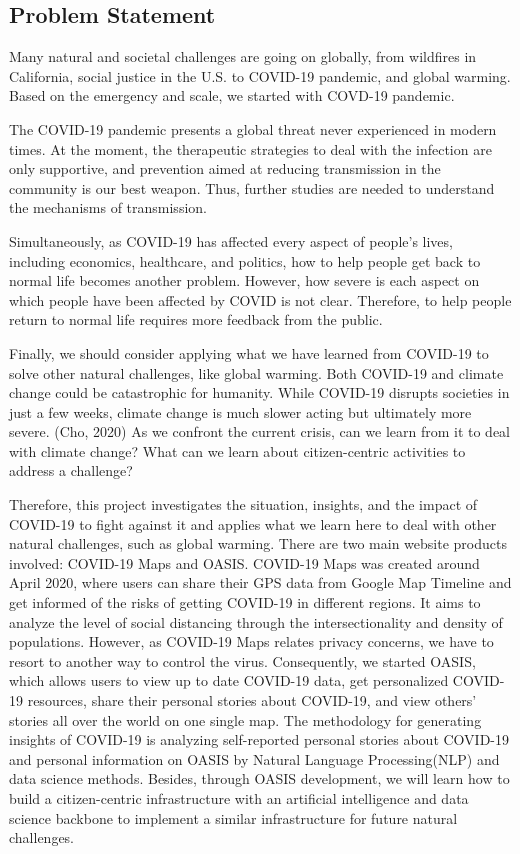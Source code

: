 \documentclass{ucsdreport}
\begin{document}
\subsection{Problem Statement}
Many natural and societal challenges are going on globally, from wildfires in 
California, social justice in the U.S. to COVID-19 pandemic, and global 
warming. Based on the emergency and scale, we started with COVD-19 pandemic. 

The COVID-19 pandemic presents a global threat never experienced in modern 
times. At the moment, the therapeutic strategies to deal with the infection are
only supportive, and prevention aimed at reducing transmission in the community
is our best weapon. Thus, further studies are needed to understand the 
mechanisms of transmission.

Simultaneously, as COVID-19 has affected every aspect of people’s lives, 
including economics, healthcare, and politics, how to help people get back to 
normal life becomes another problem. However, how severe is each aspect on 
which people have been affected by COVID is not clear. Therefore, to help 
people return to normal life requires more feedback from the public. 

Finally, we should consider applying what we have learned from COVID-19 to 
solve other natural challenges, like global warming. Both COVID-19 and climate 
change could be catastrophic for humanity. While COVID-19 disrupts societies in
just a few weeks, climate change is much slower acting but ultimately more 
severe. (Cho, 2020) As we confront the current crisis, 
can we learn from it to deal with climate change? What can we learn about 
citizen-centric activities to address a challenge? 

Therefore, this project investigates the situation, insights, and the impact 
of COVID-19 to fight against it and applies what we learn here to deal with 
other natural challenges, such as global warming. There are two main website 
products involved: COVID-19 Maps and OASIS. COVID-19 Maps was created around 
April 2020, where users can share their GPS data from Google Map Timeline and 
get informed of the risks of getting COVID-19 in different regions. It aims 
to analyze the level of social distancing through the intersectionality and 
density of populations. However, as COVID-19 Maps relates privacy concerns, 
we have to resort to another way to control the virus. Consequently, we started
OASIS, which allows users to view up to date COVID-19 data, get personalized 
COVID-19 resources, share their personal stories about COVID-19, and view 
others’ stories all over the world on one single map. The methodology for 
generating insights of COVID-19 is analyzing self-reported personal stories 
about COVID-19 and personal information on OASIS by Natural Language 
Processing(NLP) and data science methods. Besides, through OASIS development, 
we will learn how to build a citizen-centric infrastructure with an artificial
intelligence and data science backbone to implement a similar infrastructure 
for future natural challenges. 
\end{document}
